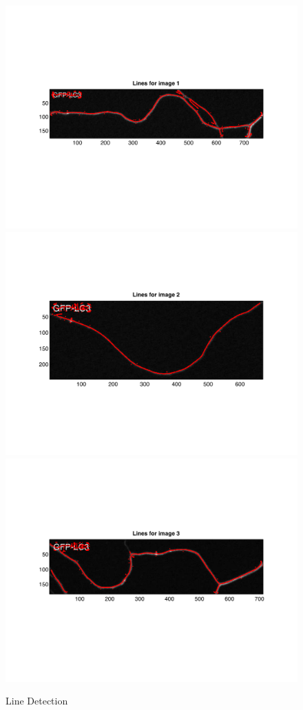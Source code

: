\documentclass{article}
\begin{document}
\begin{figure}[h]
\includegraphics[width=\textwidth]{figures/line_detection_1.pdf}
\includegraphics[width=\textwidth]{figures/line_detection_2.pdf}
\includegraphics[width=\textwidth]{figures/line_detection_3.pdf}
\caption{Line Detection}
\label{fig:line_detect}
\end{figure}
\end{document}
